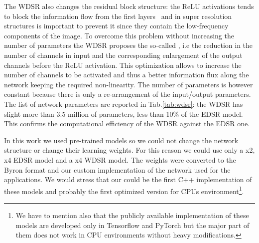 \documentclass{standalone}
\begin{document}
The WDSR also changes the residual block structure: the ReLU activations tends to block the information flow from the first layers~\cite{mobilenet} and in super resolution structures is important to prevent it since they contain the low-frequency components of the image.
To overcome this problem without increasing the number of parameters the WDSR proposes the so-called , i.e the reduction in the number of channels in input and the corresponding enlargement of the output channels before the ReLU activation.
This optimization allows to increase the number of channels to be activated and thus a better information flux along the network keeping the required non-linearity.
The number of parameters is however constant because there is only a re-arrangement of the input/output parameters.
The list of network parameters are reported in Tab.\ref{tab:wdsr}: the WDSR has slight more than 3.5 million of parameters, less than 10\% of the EDSR model.
This confirms the computational efficiency of the WDSR against the EDSR one.

In this work we used pre-trained models so we could not change the network structure or change their learning weights.
For this reason we could use only a x2, x4 EDSR model and a x4 WDSR model.
The weights were converted to the \textsf{Byron} format and our custom implementation of the network used for the applications.
We would stress that our could be the first \textsf{C++} implementation of these models and probably the first optimized version for CPUs environment\footnote{
  We have to mention also that the publicly available implementation of these models are developed only in \textsf{Tensorflow} and \textsf{PyTorch} but the major part of them does not work in CPU environments without heavy modifications.
}.
\end{document}
